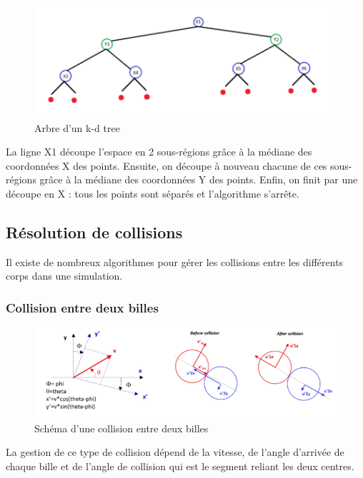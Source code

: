 \documentclass{report}
\begin{document}
\begin{figure}[H]
\centering
\includegraphics[scale=0.6]{arbre_kdtree.png}
\caption{Arbre d'un k-d tree}
\end{figure}

La ligne X1 découpe l’espace en 2 sous-régions grâce à la médiane des coordonnées X des points. Ensuite, on découpe à nouveau chacune de ces sous-régions grâce à la médiane des coordonnées Y des points. Enfin, on finit par une découpe en X : tous les points sont séparés et l’algorithme s’arrête.

\newpage
\subsection{Résolution de collisions}

Il existe de nombreux algorithmes pour gérer les collisions entre les différents corps dans une simulation.

\subsubsection{Collision entre deux billes}

\begin{figure}[H]
\centering
\includegraphics[scale=0.9]{collision_bille_bille.png}
\caption{Schéma d'une collision entre deux billes \cite{04}}
\end{figure}

La gestion de ce type de collision dépend de la vitesse, de l’angle d’arrivée de chaque bille et de l’angle de collision qui est le segment reliant les deux centres. \\
\end{document}
